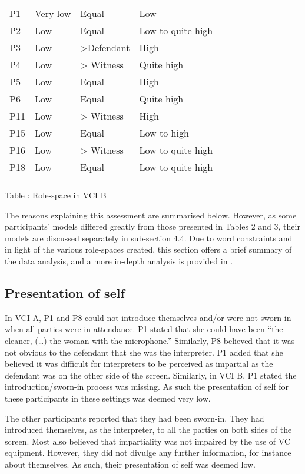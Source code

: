 \documentclass[output=paper]{langsci/langscibook}
\begin{document}
\begin{tabularx}{\textwidth}{XXXX}
\lsptoprule
P1 & Very low & Equal & Low\\
P2 & Low & Equal & Low to quite high\\
P3 & Low & >Defendant & High\\
P4 & Low & > Witness & Quite high\\
P5 & Low & Equal & High\\
P6 & Low & Equal & Quite high \\
P11 & Low & > Witness & High\\
P15 & Low & Equal & Low to high \\
P16 & Low & > Witness & Low to quite high\\
P18 & Low & Equal & Low to quite high\\
\lspbottomrule
\end{tabularx}
\begin{stylecaption}
Table : Role-space in VCI B
\end{stylecaption}

The reasons explaining this assessment are summarised below. However, as some participants’ models differed greatly from those presented in Tables 2 and 3, their models are discussed separately in sub-section 4.4. Due to word constraints and in light of the various role-spaces created, this section offers a brief summary of the data analysis, and a more in-depth analysis is provided in \citet{Devaux2017b}.

\subsection{Presentation of self}

In VCI A, P1 and P8 could not introduce themselves and/or were not sworn-in when all parties were in attendance. P1 stated that she could have been “the cleaner, (…) the woman with the microphone.” Similarly, P8 believed that it was not obvious to the defendant that she was the interpreter. P1 added that she believed it was difficult for interpreters to be perceived as impartial as the defendant was on the other side of the screen. Similarly, in VCI B, P1 stated the introduction/sworn-in process was missing. As such the presentation of self for these participants in these settings was deemed very low. 

The other participants reported that they had been sworn-in. They had introduced themselves, as the interpreter, to all the parties on both sides of the screen. Most also believed that impartiality was not impaired by the use of VC equipment. However, they did not divulge any further information, for instance about themselves. As such, their presentation of self was deemed low.
\end{document}
